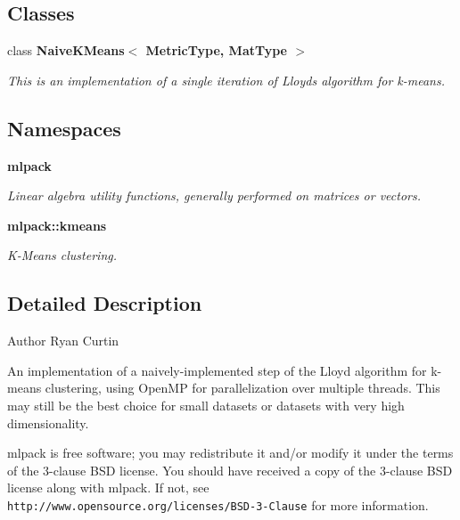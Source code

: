 \subsection*{Classes}
\begin{DoxyCompactItemize}
\item 
class \textbf{ Naive\+K\+Means$<$ Metric\+Type, Mat\+Type $>$}
\begin{DoxyCompactList}\small\item\em This is an implementation of a single iteration of Lloyd\textquotesingle{}s algorithm for k-\/means. \end{DoxyCompactList}\end{DoxyCompactItemize}
\subsection*{Namespaces}
\begin{DoxyCompactItemize}
\item 
 \textbf{ mlpack}
\begin{DoxyCompactList}\small\item\em Linear algebra utility functions, generally performed on matrices or vectors. \end{DoxyCompactList}\item 
 \textbf{ mlpack\+::kmeans}
\begin{DoxyCompactList}\small\item\em K-\/\+Means clustering. \end{DoxyCompactList}\end{DoxyCompactItemize}


\subsection{Detailed Description}
\begin{DoxyAuthor}{Author}
Ryan Curtin
\end{DoxyAuthor}
An implementation of a naively-\/implemented step of the Lloyd algorithm for k-\/means clustering, using Open\+MP for parallelization over multiple threads. This may still be the best choice for small datasets or datasets with very high dimensionality.

mlpack is free software; you may redistribute it and/or modify it under the terms of the 3-\/clause B\+SD license. You should have received a copy of the 3-\/clause B\+SD license along with mlpack. If not, see {\tt http\+://www.\+opensource.\+org/licenses/\+B\+S\+D-\/3-\/\+Clause} for more information. 